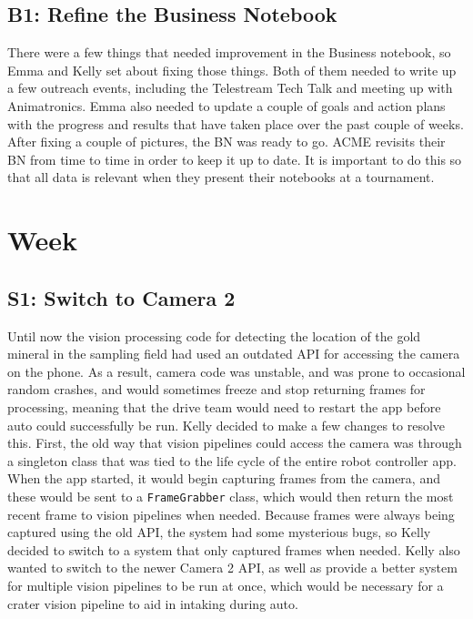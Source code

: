 \documentclass{article}
\begin{document}
\subsection{B1: Refine the Business Notebook}

There were a few things that needed improvement in the Business notebook, so Emma and Kelly set about fixing those things. Both of them needed to write up a few outreach events, including the Telestream Tech Talk and meeting up with Animatronics. Emma also needed to update a couple of goals and action plans with the progress and results that have taken place over the past couple of weeks. After fixing a couple of pictures, the BN was ready to go. ACME revisits their BN from time to time in order to keep it up to date. It is important to do this so that all data is relevant when they present their notebooks at a tournament. 

\clearpage \newpage \section{Week \thesection} 
\subsection{S1: Switch to Camera 2}

Until now the vision processing code for detecting the location of the gold mineral in the sampling field had used an outdated API for accessing the camera on the phone. As a result, camera code was unstable, and was prone to occasional random crashes, and would sometimes freeze and stop returning frames for processing, meaning that the drive team would need to restart the app before auto could successfully be run. Kelly decided to make a few changes to resolve this. First, the old way that vision pipelines could access the camera was through a singleton class that was tied to the life cycle of the entire robot controller app. When the app started, it would begin capturing frames from the camera, and these would be sent to a \texttt{FrameGrabber} class, which would then return the most recent frame to vision pipelines when needed. Because frames were always being captured using the old API, the system had some mysterious bugs, so Kelly decided to switch to a system that only captured frames when needed. Kelly also wanted to switch to the newer Camera 2 API, as well as provide a better system for multiple vision pipelines to be run at once, which would be necessary for a crater vision pipeline to aid in intaking during auto.
\end{document}
